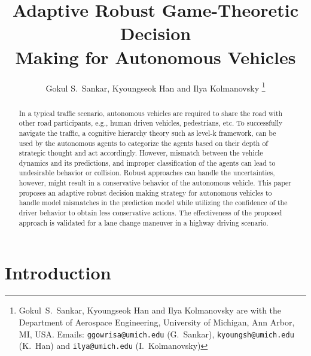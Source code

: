 \documentclass[10pt,journal]{IEEEtran}
\begin{document}
	
	\title{Adaptive Robust Game-Theoretic Decision \\ Making for Autonomous Vehicles}

	\thispagestyle{empty}

	\author{
		Gokul S.~Sankar,  Kyoungseok Han and Ilya Kolmanovsky%
		\thanks{Gokul~S.~Sankar,  Kyoungseok Han and Ilya Kolmanovsky are with the Department of Aerospace Engineering, University of Michigan, Ann Arbor, MI, USA. Emails: {\tt\small ggowrisa@umich.edu} (G.~Sankar), 
			{\tt\small kyoungsh@umich.edu} (K.~Han) and  {\tt\small ilya@umich.edu} (I.~Kolmanovsky) }%
	}

	\maketitle
	
	
	
	\begin{abstract}
		
		In a typical traffic scenario, autonomous vehicles are required to share the road with other road participants, e.g., human driven vehicles, pedestrians, etc. To successfully navigate the traffic, a cognitive hierarchy theory such as level-k framework, can be used by the autonomous agents to categorize the agents based on their depth of strategic thought and act accordingly. However, mismatch between the vehicle dynamics and its predictions, and improper classification of the agents can lead to undesirable behavior or collision. Robust approaches can handle the  uncertainties, however, might result in a conservative behavior of the autonomous vehicle. This paper proposes an adaptive robust decision making strategy for autonomous vehicles to handle model mismatches in the prediction model while utilizing the confidence of the driver behavior to obtain less conservative actions. The effectiveness of the proposed approach is validated for a lane change maneuver in a highway driving scenario.
	
	\end{abstract}
	
	

	
	\section{Introduction}
	\label{sec:intro}
\end{document}
